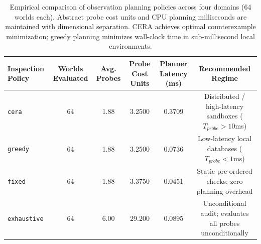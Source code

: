 \begin{table}[t]
\centering
\small
\begin{tabular}{lccccc}
\toprule
\textbf{Inspection Policy} & \textbf{Worlds Evaluated} & \textbf{Avg. Probes} & \textbf{Probe Cost Units} & \textbf{Planner Latency (ms)} & \textbf{Recommended Regime} \\
\midrule
\texttt{cera}       & 64 & 1.88 & 3.2500 & 0.3709 & Distributed / high-latency sandboxes ($T_{probe} > 10$ms) \\
\texttt{greedy}     & 64 & 1.88 & 3.2500 & 0.0736 & Low-latency local databases ($T_{probe} < 1$ms) \\
\texttt{fixed}      & 64 & 1.88 & 3.3750 & 0.0451 & Static pre-ordered checks; zero planning overhead \\
\texttt{exhaustive} & 64 & 6.00 & 29.200 & 0.0895 & Unconditional audit; evaluates all probes unconditionally \\
\bottomrule
\end{tabular}
\caption{Empirical comparison of observation planning policies across four domains (64 worlds each). Abstract probe cost units and CPU planning milliseconds are maintained with dimensional separation. CERA achieves optimal counterexample minimization; greedy planning minimizes wall-clock time in sub-millisecond local environments.}
\label{tab:cera_cost}
\end{table}
